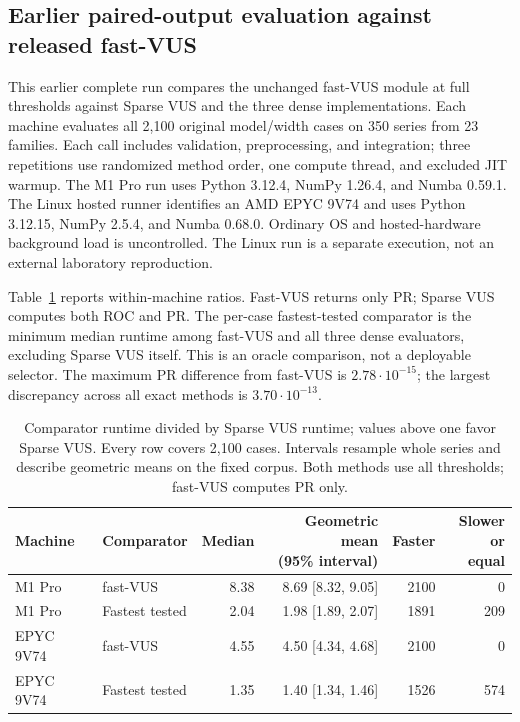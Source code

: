 \subsection{Earlier paired-output evaluation against released fast-VUS}
This earlier complete run compares the unchanged fast-VUS module at full thresholds
against Sparse VUS and the three dense implementations. Each machine evaluates
all 2,100 original model/width cases on 350 series from 23 families. Each call
includes validation, preprocessing, and integration; three repetitions use
randomized method order, one compute thread, and excluded JIT warmup.
The M1 Pro run uses Python 3.12.4, NumPy 1.26.4, and Numba 0.59.1.
The Linux hosted runner identifies an AMD EPYC 9V74 and uses Python 3.12.15,
NumPy 2.5.4, and Numba 0.68.0. Ordinary OS and hosted-hardware background load
is uncontrolled. The Linux run is a separate execution, not an external
laboratory reproduction.

Table~\ref{tab:fast-vus} reports within-machine ratios. Fast-VUS returns only
PR; Sparse VUS computes both ROC and PR. The per-case fastest-tested comparator
is the minimum median runtime among fast-VUS and all three dense evaluators,
excluding Sparse VUS itself. This is an oracle comparison, not a deployable
selector. The maximum PR difference from fast-VUS is $2.78\cdot10^{-15}$;
the largest discrepancy across all exact methods is $3.70\cdot10^{-13}$.

\begin{table}[t]
\centering
\begin{tabular}{llrrrr}
\toprule
Machine & Comparator & Median & \shortstack{Geometric mean\\(95\% interval)} & Faster & \shortstack{Slower\\or equal}\\
\midrule
M1 Pro & fast-VUS & 8.38 & 8.69 [8.32, 9.05] & 2100 & 0 \\
M1 Pro & Fastest tested & 2.04 & 1.98 [1.89, 2.07] & 1891 & 209 \\
EPYC 9V74 & fast-VUS & 4.55 & 4.50 [4.34, 4.68] & 2100 & 0 \\
EPYC 9V74 & Fastest tested & 1.35 & 1.40 [1.34, 1.46] & 1526 & 574 \\
\bottomrule
\end{tabular}
\caption{Comparator runtime divided by Sparse VUS runtime; values above one
favor Sparse VUS. Every row covers 2,100 cases. Intervals resample whole series
and describe geometric means on the fixed corpus. Both methods use all
thresholds; fast-VUS computes PR only.}
\label{tab:fast-vus}
\end{table}

